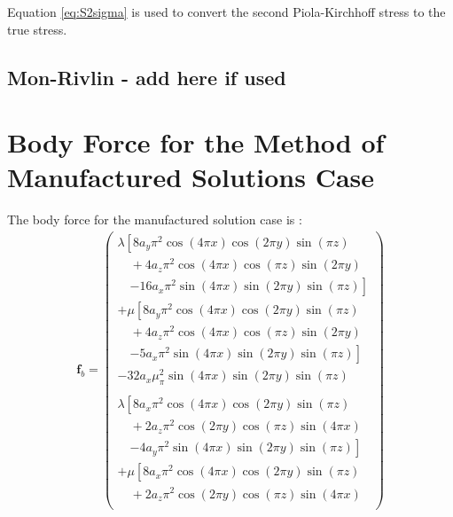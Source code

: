 \documentclass[sn-mathphys,Numbered]{sn-jnl}%
\newcommand{\bb}{\boldsymbol}
\begin{document}
\begin{appendices}
Equation \ref{eq:S2sigma} is used to convert the second Piola-Kirchhoff stress to the true stress.
%
\subsection{Mon-Rivlin - add here if used}
%


%
%
\section{Body Force for the Method of Manufactured Solutions Case} 
\label{app:mms}
%
%
The body force for the manufactured solution case is \citep{Mazzanti2024}:
\begin{align}
\bb{f}_b = 
    \begin{pmatrix}
    \lambda
    \left[
        8 a_y \pi^2 \cos(4\pi x) \cos(2\pi y) \sin(\pi z) \right. \\
        \quad + 4 a_z \pi^2 \cos(4\pi x) \cos(\pi z) \sin(2\pi y) \\
        \quad \left. - 16 a_x \pi^2 \sin(4\pi x) \sin(2\pi y) \sin(\pi z)
    \right] \\
    + \mu
    \left[
        8 a_y \pi^2 \cos(4\pi x) \cos(2\pi y) \sin(\pi z) \right. \\
        \quad + 4 a_z \pi^2 \cos(4\pi x) \cos(\pi z) \sin(2\pi y) \\
        \quad \left. - 5 a_x \pi^2 \sin(4\pi x) \sin(2\pi y) \sin(\pi z)
    \right] \\
    - 32 a_x \mu_ \pi^2 \sin(4\pi x) \sin(2\pi y) \sin(\pi z) \\
    \\
    \lambda
    \left[
        8 a_x \pi^2 \cos(4\pi x) \cos(2\pi y) \sin(\pi z) \right. \\
        \quad + 2 a_z \pi^2 \cos(2\pi y) \cos(\pi z) \sin(4\pi x) \\
        \quad \left. - 4 a_y \pi^2 \sin(4\pi x) \sin(2\pi y) \sin(\pi z)
    \right] \\
    + \mu
    \left[
        8 a_x \pi^2 \cos(4\pi x) \cos(2\pi y) \sin(\pi z) \right. \\
        \quad + 2 a_z \pi^2 \cos(2\pi y) \cos(\pi z) \sin(4\pi x) \\

\end{pmatrix}
\end{align}
\end{appendices}
\end{document}

